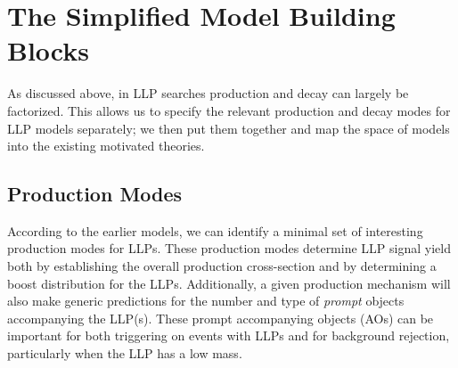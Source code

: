 \section{The Simplified Model Building Blocks}\label{sec:building_blocks}


As discussed above, in LLP searches production and decay can largely be factorized. This allows us to specify the relevant production and decay modes for LLP models separately; we then put them together and map the space of models into the existing motivated theories.

\subsection{Production Modes}

According to the earlier models, we can identify a minimal set of interesting production modes for LLPs.
These production modes determine LLP signal yield both by establishing the overall production cross-section and by determining a boost distribution for the LLPs.   Additionally, a given production mechanism will also  make generic predictions for the number and type of {\em prompt} objects accompanying the LLP(s).  These prompt accompanying objects (AOs) can be important for both triggering on events with LLPs and for background rejection, particularly when the LLP has a low mass. 

